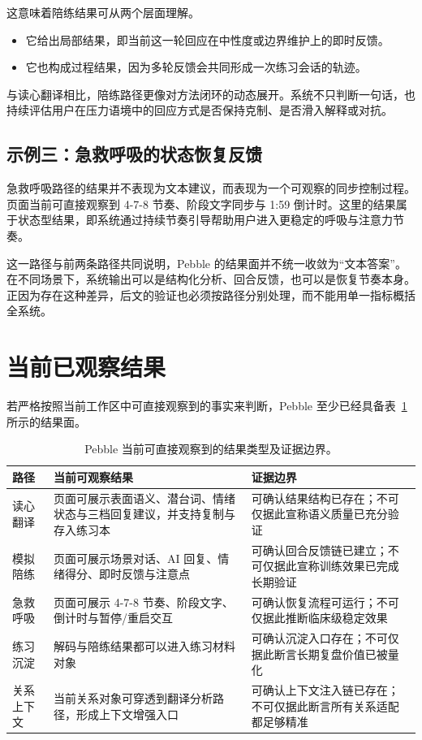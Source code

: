 这意味着陪练结果可从两个层面理解。

\begin{itemize}
  \item 它给出局部结果，即当前这一轮回应在中性度或边界维护上的即时反馈。
  \item 它也构成过程结果，因为多轮反馈会共同形成一次练习会话的轨迹。
\end{itemize}

与读心翻译相比，陪练路径更像对方法闭环的动态展开。系统不只判断一句话，也持续评估用户在压力语境中的回应方式是否保持克制、是否滑入解释或对抗。

\subsection{示例三：急救呼吸的状态恢复反馈}

急救呼吸路径的结果并不表现为文本建议，而表现为一个可观察的同步控制过程。页面当前可直接观察到 4-7-8 节奏、阶段文字同步与 1:59 倒计时。这里的结果属于状态型结果，即系统通过持续节奏引导帮助用户进入更稳定的呼吸与注意力节奏。

这一路径与前两条路径共同说明，Pebble 的结果面并不统一收敛为“文本答案”。在不同场景下，系统输出可以是结构化分析、回合反馈，也可以是恢复节奏本身。正因为存在这种差异，后文的验证也必须按路径分别处理，而不能用单一指标概括全系统。

\section{当前已观察结果}

若严格按照当前工作区中可直接观察到的事实来判断，Pebble 至少已经具备表~\ref{tab:pebble-observed-results} 所示的结果面。

\begin{table}[H]
  \centering
  \caption{Pebble 当前可直接观察到的结果类型及证据边界。}
  \label{tab:pebble-observed-results}
  \begin{tabularx}{\textwidth}{>{\raggedright\arraybackslash}p{2.7cm} >{\raggedright\arraybackslash}X >{\raggedright\arraybackslash}X}
    \toprule
    路径 & 当前可观察结果 & 证据边界 \\
    \midrule
    读心翻译 & 页面可展示表面语义、潜台词、情绪状态与三档回复建议，并支持复制与存入练习本 & 可确认结果结构已存在；不可仅据此宣称语义质量已充分验证 \\
    模拟陪练 & 页面可展示场景对话、AI 回复、情绪得分、即时反馈与注意点 & 可确认回合反馈链已建立；不可仅据此宣称训练效果已完成长期验证 \\
    急救呼吸 & 页面可展示 4-7-8 节奏、阶段文字、倒计时与暂停/重启交互 & 可确认恢复流程可运行；不可仅据此推断临床级稳定效果 \\
    练习沉淀 & 解码与陪练结果都可以进入练习材料对象 & 可确认沉淀入口存在；不可仅据此断言长期复盘价值已被量化 \\
    关系上下文 & 当前关系对象可穿透到翻译分析路径，形成上下文增强入口 & 可确认上下文注入链已存在；不可仅据此断言所有关系适配都足够精准 \\
    \bottomrule
  \end{tabularx}
\end{table}

